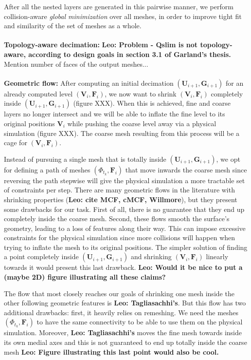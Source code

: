 \documentclass{acmtog}
\newcommand{\leo}[1]{{\bf\textcolor[rgb]{0.9,0.0,0.0}{Leo: #1}}}
\begin{document}
After all the nested layers are generated in this pairwise manner, we perform collision-aware \emph{global  minimization} over all meshes, in order to improve tight fit and similarity of the set of meshes as a whole. \\
\\
\textbf{Topology-aware decimation:} \leo{Problem - Qslim is not topology-aware, according to design goals in section 3.1 of Garland's thesis.} Mention number of faces of the output meshes... \\
\\
\textbf{Geometric flow:} After computing an initial decimation $(\mathbf{U}_{i+1},\mathbf{G}_{i+1})$ for an already computed level $(\mathbf{V}_{i},\mathbf{F}_{i})$, we now want to shrink $(\mathbf{V}_{i},\mathbf{F}_{i})$ completely inside $(\mathbf{U}_{i+1},\mathbf{G}_{i+1})$ (figure XXX). When this is achieved, fine and coarse layers no longer intersect and we will be able to inflate the fine level to its original positions $\mathbf{V}_{i}$ while pushing the coarse level away via a physical simulation (figure XXX). The coarse mesh resulting from this process will be a cage for $(\mathbf{V}_{i},\mathbf{F}_{i})$. 

Instead of pursuing a single mesh that is totally inside $(\mathbf{U}_{i+1},\mathbf{G}_{i+1})$, we opt for defining a path of meshes $(\Phi_{t_k},\mathbf{F}_{i})$ that move inwards the coarse mesh since reversing the path stepwise will give the physical simulation a more tractable set of constraints per step. There are many geometric flows in the literature with shrinking properties (\leo{cite MCF, cMCF, Willmore}), but they present some drawbacks for our task. First of all, there is no guarantee that they end up completely inside the coarse mesh. Second, these flows smooth the surface's geometry, leading to a loss of features along their way. This can impose excessive constraints for the physical simulation since more collisions will happen when trying to inflate the mesh to its original positions. The simpler solution of finding a point completely inside $(\mathbf{U}_{i+1},\mathbf{G}_{i+1})$ and shrinking $(\mathbf{V}_i,\mathbf{F}_{i})$ linearly towards it would present this last drawback. \leo{Would it be nice to put a (maybe 2D) figure illustrating all these claims?} 

The flow that most closely reaches our goals of shrinking one mesh inside the other following geometric features is \leo{Tagliasachhi's}. But this flow has two additional drawbacks: first, it heavily relies on remeshing. We need the meshes $(\Phi_{t_k},\mathbf{F}_{i})$ to have the same connectivity to be able to use them on the physical simulation. Moreover, \leo{Tagliasachhi's} moves the fine mesh towards inside its own medial axes and this is not guaranteed to end up totally inside the coarse mesh \leo{Figure illustrating this last point would also be cool.} 
\end{document}
